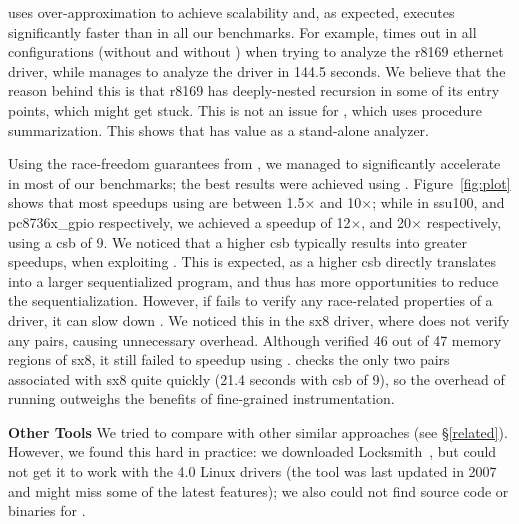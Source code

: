 \whoop uses over-approximation to achieve scalability and, as expected, executes significantly faster than \corral in all our benchmarks. For example, \corral times out in all configurations (without and without \whoop) when trying to analyze the r8169 ethernet driver, while \whoop manages to analyze the driver in 144.5 seconds. We believe that the reason behind this is that r8169 has deeply-nested recursion in some of its entry points, which might get \corral stuck. This is not an issue for \whoop, which uses procedure summarization. This shows that \whoop has value as a stand-alone analyzer.

Using the race-freedom guarantees from \whoop, we managed to significantly accelerate \corral in most of our benchmarks; the best results were achieved using \yieldmr. Figure~\ref{fig:plot} shows that most speedups using \yieldmr are between 1.5$\times$ and 10$\times$; while in ssu100, and pc8736x\_gpio respectively, we achieved a speedup of 12$\times$, and 20$\times$ respectively, using a csb of 9. We noticed that a higher csb typically results into greater speedups, when exploiting \whoop. This is expected, as a higher csb directly translates into a larger sequentialized program, and thus \whoop has more opportunities to reduce the sequentialization.
%
However, if \whoop fails to verify any race-related properties of a driver, it can slow down \corral. We noticed this in the sx8 driver, where \whoop does not verify any pairs, causing unnecessary overhead. Although \whoop verified 46 out of 47 memory regions of sx8, it still failed to speedup \corral using \yieldmr. \corral checks the only two pairs associated with sx8 quite quickly (21.4 seconds with csb of 9), so the overhead of running \whoop outweighs the benefits of fine-grained instrumentation.

\noindent\textbf{Other Tools }
%
We tried to compare \whoop with other similar approaches (see \S\ref{related}). However, we found this hard in practice: we downloaded Locksmith~\cite{pratikakis2006locksmith}, but could not get it to work with the 4.0 Linux drivers (the tool was last updated in 2007 and might miss some of the latest features); we also could not find source code or binaries for \cite{kahlon2007fast, kahlon2009semantic, das2015section}.
